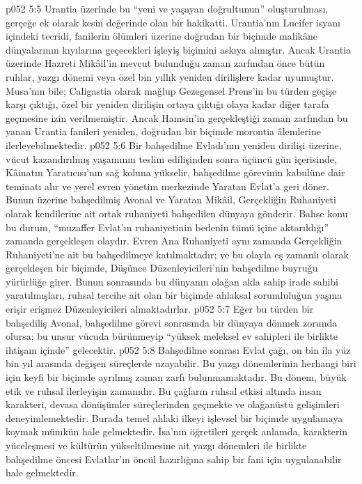 \vs p052 5:5 Urantia üzerinde bu “yeni ve yaşayan doğrultunun” oluşturulması, gerçeğe ek olarak kesin değerinde olan bir hakikatti. Urantia’nın Lucifer isyanı içindeki tecridi, fanilerin ölümleri üzerine doğrudan bir biçimde malikâne dünyalarının kıyılarına geçecekleri işleyiş biçimini askıya almıştır. Ancak Urantia üzerinde Hazreti Mikâil’in mevcut bulunduğu zaman zarfından önce bütün ruhlar, yazgı dönemi veya özel bin yıllık yeniden dirilişlere kadar uyumuştur. Musa’nın bile; Caligastia olarak mağlup Gezegensel Prens’in bu türden geçişe karşı çıktığı, özel bir yeniden dirilişin ortaya çıktığı olaya kadar diğer tarafa geçmesine izin verilmemiştir. Ancak Hamsin’in gerçekleştiği zaman zarfından bu yanan Urantia fanileri yeniden, doğrudan bir biçimde morontia âlemlerine ilerleyebilmektedir.
\vs p052 5:6 Bir bahşedilme Evladı’nın yeniden dirilişi üzerine, vücut kazandırılmış yaşamının teslim edilişinden sonra üçüncü gün içerisinde, Kâinatın Yaratıcısı’nın sağ koluna yükselir, bahşedilme görevinin kabulüne dair teminatı alır ve yerel evren yönetim merkezinde Yaratan Evlat’a geri döner. Bunun üzerine bahşedilmiş Avonal ve Yaratan Mikâil, Gerçekliğin Ruhaniyeti olarak kendilerine ait ortak ruhaniyeti bahşedilen dünyaya gönderir. Bahse konu bu durum, “muzaffer Evlat’ın ruhaniyetinin bedenin tümü içine aktarıldığı” zamanda gerçekleşen olaydır. Evren Ana Ruhaniyeti aynı zamanda Gerçekliğin Ruhaniyeti’ne ait bu bahşedilmeye katılmaktadır; ve bu olayla eş zamanlı olarak gerçekleşen bir biçimde, Düşünce Düzenleyicileri’nin bahşedilme buyruğu yürürlüğe girer. Bunun sonrasında bu dünyanın olağan akla sahip irade sahibi yaratılmışları, ruhsal tercihe ait olan bir biçimde ahlaksal sorumluluğun yaşına erişir erişmez Düzenleyicileri almaktadırlar.
\vs p052 5:7 Eğer bu türden bir bahşediliş Avonal, bahşedilme görevi sonrasında bir dünyaya dönmek zorunda olursa; bu unsur vücuda bürünmeyip “yüksek meleksel ev sahipleri ile birlikte ihtişam içinde” gelecektir.
\vs p052 5:8 Bahşedilme sonrası Evlat çağı, on bin ila yüz bin yıl arasında değişen süreçlerde uzayabilir. Bu yazgı dönemlerinin herhangi biri için keyfi bir biçimde ayrılmış zaman zarfı bulunmamaktadır. Bu dönem, büyük etik ve ruhsal ilerleyişin zamanıdır. Bu çağların ruhsal etkisi altında insan karakteri, devasa dönüşümler süreçlerinden geçmekte ve olağanüstü gelişimleri deneyimlemektedir. Burada temel ahlaki ilkeyi işlevsel bir biçimde uygulamaya koymak mümkün hale gelmektedir. İsa’nın öğretileri gerçek anlamda, karakterin yüceleşmesi ve kültürün yükseltilmesine ait yazgı dönemleri ile birlikte bahşedilme öncesi Evlatlar’ın öncül hazırlığına sahip bir fani için uygulanabilir hale gelmektedir.
